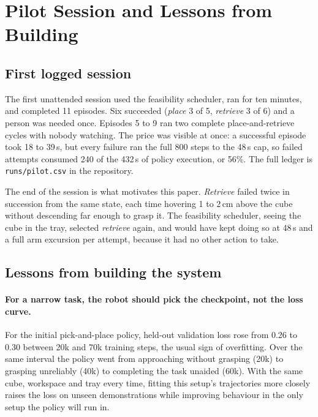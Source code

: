 \documentclass[runningheads]{llncs}
\newcommand{\task}[1]{\textit{#1}}
\begin{document}
\section{Pilot Session and Lessons from Building}
\label{sec:pilot}

\subsection{First logged session}
\label{sec:pilot-session}

The first unattended session used the feasibility scheduler, ran for ten minutes, and completed 11 episodes. Six succeeded (\task{place} 3 of 5, \task{retrieve} 3 of 6) and a person was needed once. Episodes 5 to 9 ran two complete place-and-retrieve cycles with nobody watching. The price was visible at once: a successful episode took 18 to 39\,s, but every failure ran the full 800 steps to the 48\,s cap, so failed attempts consumed 240 of the 432\,s of policy execution, or 56\%. The full ledger is \texttt{runs/pilot.csv} in the repository.

The end of the session is what motivates this paper. \task{Retrieve} failed twice in succession from the same state, each time hovering 1 to 2\,cm above the cube without descending far enough to grasp it. The feasibility scheduler, seeing the cube in the tray, selected \task{retrieve} again, and would have kept doing so at 48\,s and a full arm excursion per attempt, because it had no other action to take.

\subsection{Lessons from building the system}
\label{sec:observations}

\paragraph{For a narrow task, the robot should pick the checkpoint, not the loss curve.}
For the initial pick-and-place policy, held-out validation loss rose from 0.26 to 0.30 between 20k and 70k training steps, the usual sign of overfitting. Over the same interval the policy went from approaching without grasping (20k) to grasping unreliably (40k) to completing the task unaided (60k). With the same cube, workspace and tray every time, fitting this setup's trajectories more closely raises the loss on unseen demonstrations while improving behaviour in the only setup the policy will run in.
\end{document}
